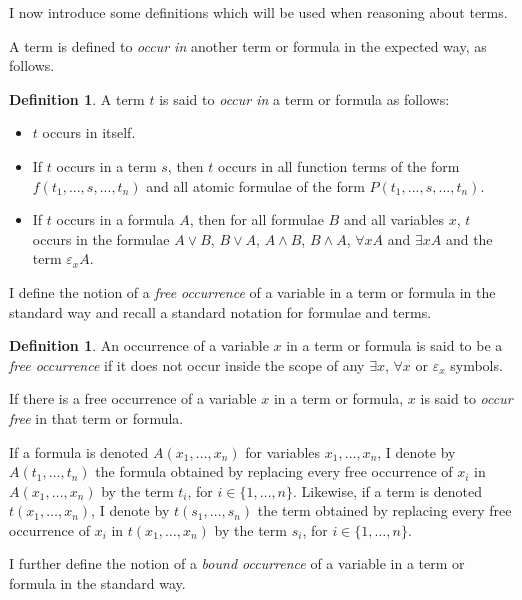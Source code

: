 \documentclass[10pt]{article}
\theoremstyle{definition}\newtheorem{remark}[theorem]{Remark}
\theoremstyle{definition}\newtheorem{example}[theorem]{Example}
\theoremstyle{definition}\newtheorem{definition}[theorem]{Definition}
\begin{document}
	I now introduce some definitions which will be used when reasoning about terms.
	
	A term is defined to \textit{occur in} another term or formula in the expected way, as follows.
	
	\begin{definition}\label{OccurInDefn}
		A term $t$ is said to \textit{occur in} a term or formula as follows:
		
		\begin{itemize}
			\item $t$ occurs in itself.
			
			\item If $t$ occurs in a term $s$, then $t$ occurs in all function terms of the form $f(t_1, ... , s, ... , t_n)$ and all atomic formulae of the form $P(t_1, ... , s, ... , t_n)$.
			
			\item If $t$ occurs in a formula $A$, then for all formulae $B$ and all variables $x$, $t$ occurs in the formulae $A \lor B$, $B \lor A$, $A \land B$, $B \land A$, $\forall x A$ and $\exists x A$ and the term $\varepsilon_x A$.
		\end{itemize}
	\end{definition}

	I define the notion of a \textit{free occurrence} of a variable in a term or formula in the standard way and recall a standard notation for formulae and terms.
	
	\begin{definition}\label{FreeOccurrenceDefn}
		An occurrence of a variable $x$ in a term or formula is said to be a \textit{free occurrence} if it does not occur inside the scope of any $\exists x$, $\forall x$ or $\varepsilon_x$ symbols.
		
		If there is a free occurrence of a variable $x$ in a term or formula, $x$ is said to \textit{occur free} in that term or formula.
		
		If a formula is denoted $A(x_1, \dots, x_n)$ for variables $x_1, \dots, x_n$, I denote by $A(t_1, \dots, t_n)$ the formula obtained by replacing every free occurrence of $x_i$ in $A(x_1, \dots, x_n)$ by the term $t_i$, for $i \in \{1, \dots, n\}$. Likewise, if a term is denoted $t(x_1, \dots, x_n)$, I denote by $t(s_1, \dots, s_n)$ the term obtained by replacing every free occurrence of $x_i$ in $t(x_1, \dots, x_n)$ by the term $s_i$, for $i \in \{1, \dots, n\}$.
	\end{definition}

	I further define the notion of a \textit{bound occurrence} of a variable in a term or formula in the standard way.
	
\end{document}
